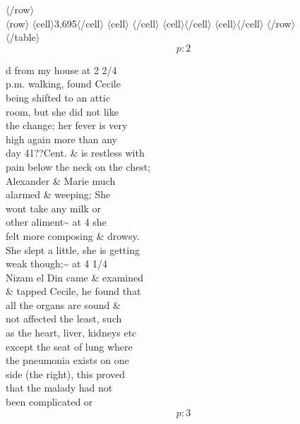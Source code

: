 \documentclass{report}
\begin{document}
{$\langle$/row$\rangle$\ \\$\langle$row$\rangle$ $\langle$cell$\rangle$3,695$\langle$/cell$\rangle$ $\langle$cell$\rangle$ $\langle$/cell$\rangle$ $\langle$cell$\rangle$$\langle$/cell$\rangle$ $\langle$cell$\rangle$$\langle$/cell$\rangle$ $\langle$/row$\rangle$\ \\$\langle$/table$\rangle$\ \\
  \[p: 2 \]

	}






	\par{
 	d from my house at 2 2/4\ \\p.m. walking, found Cecile\ \\being shifted to an attic\ \\room, but she did not like\ \\the change; her fever is very\ \\high again more than any\ \\day 41??Cent. \& is restless with\ \\pain below the neck on the chest;\ \\Alexander \& Marie much\ \\alarmed \& weeping; She\ \\wont take any milk or\ \\other aliment\~{} at 4 she\ \\felt more composing \& drowsy.\ \\She slept a little, she is getting\ \\weak though;\~{} at 4 1/4\ \\Nizam el Din came \& examined\ \\\& tapped Cecile, he found that\ \\all the organs are sound \&\ \\not affected the least, such\ \\as the heart, liver, kidneys etc\ \\except the seat of lung where\ \\the pneumonia exists on one\ \\side (the right), this proved\ \\that the malady had not\ \\been complicated or\ \\
  \[p: 3 \]

	}
\end{document}
